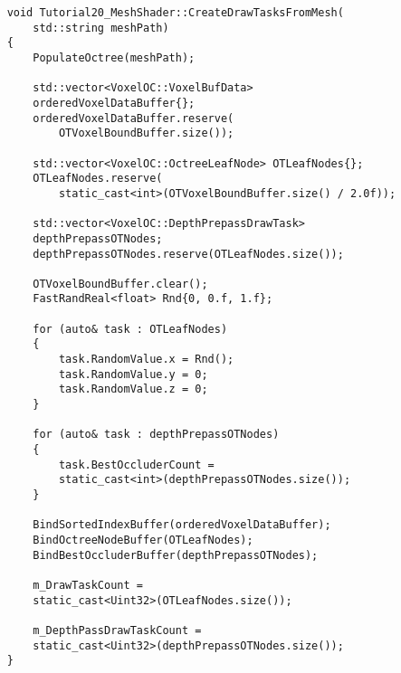 \begin{lstlisting}
    void Tutorial20_MeshShader::CreateDrawTasksFromMesh(
        std::string meshPath)
    {    
        PopulateOctree(meshPath);
        
        std::vector<VoxelOC::VoxelBufData>  
        orderedVoxelDataBuffer{};
        orderedVoxelDataBuffer.reserve(
            OTVoxelBoundBuffer.size());
        
        std::vector<VoxelOC::OctreeLeafNode> OTLeafNodes{};
        OTLeafNodes.reserve(
            static_cast<int>(OTVoxelBoundBuffer.size() / 2.0f));

        std::vector<VoxelOC::DepthPrepassDrawTask> 
        depthPrepassOTNodes;
        depthPrepassOTNodes.reserve(OTLeafNodes.size());
        
        OTVoxelBoundBuffer.clear();
        FastRandReal<float> Rnd{0, 0.f, 1.f};

        for (auto& task : OTLeafNodes)
        {
            task.RandomValue.x = Rnd();
            task.RandomValue.y = 0;
            task.RandomValue.z = 0;
        }

        for (auto& task : depthPrepassOTNodes)
        {
            task.BestOccluderCount = 
            static_cast<int>(depthPrepassOTNodes.size());
        }

        BindSortedIndexBuffer(orderedVoxelDataBuffer);
        BindOctreeNodeBuffer(OTLeafNodes);
        BindBestOccluderBuffer(depthPrepassOTNodes);
        
        m_DrawTaskCount = 
        static_cast<Uint32>(OTLeafNodes.size());

        m_DepthPassDrawTaskCount = 
        static_cast<Uint32>(depthPrepassOTNodes.size());
    }
\end{lstlisting}

